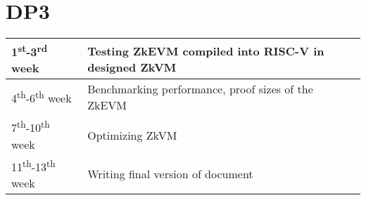 \section{DP3}

\begin{tabular}{|l||p{}|}
\hline
1\textsuperscript{st}-3\textsuperscript{rd} week    & Testing ZkEVM compiled into RISC-V in designed ZkVM \\
\hline
4\textsuperscript{th}-6\textsuperscript{th} week    & Benchmarking performance, proof sizes of the ZkEVM \\
\hline
7\textsuperscript{th}-10\textsuperscript{th} week   & Optimizing ZkVM \\
\hline
11\textsuperscript{th}-13\textsuperscript{th} week  & Writing final version of document \\
\hline
\end{tabular}
